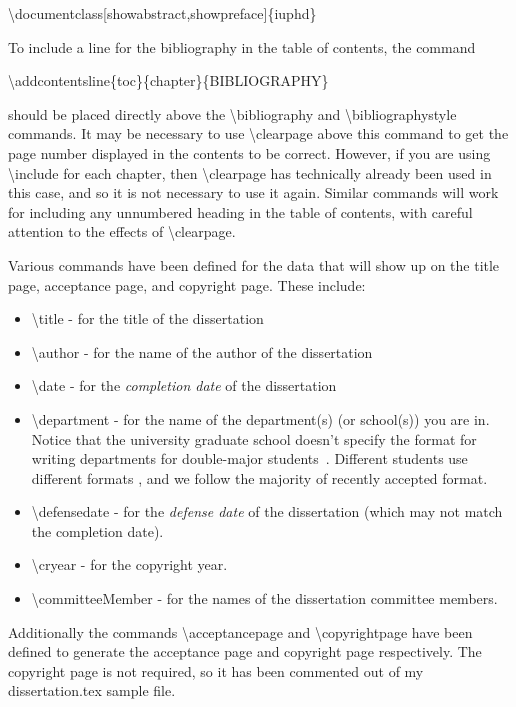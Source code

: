 \textbackslash documentclass[showabstract,showpreface]\{iuphd\}
\medskip

\noindent To include a line for the bibliography in the table of contents, the command
\medskip

\textbackslash addcontentsline\{toc\}\{chapter\}\{BIBLIOGRAPHY\}
\medskip

\noindent should be placed directly above the \textbackslash bibliography and \textbackslash bibliographystyle commands.  It may be necessary
to use \textbackslash clearpage above this command to get the page number displayed in the contents to be correct.  However, if you are using
\textbackslash include for each chapter, then \textbackslash clearpage has technically already been used in this case, and so it is not
necessary to use it again. Similar commands will work for including any unnumbered heading in the table of contents, with careful attention
to the effects of \textbackslash clearpage.

Various commands have been defined for the data that will show up on the title page, acceptance page, and copyright page.  These include:
\begin{itemize}
 \item \textbackslash title - for the title of the dissertation
 \item \textbackslash author - for the name of the author of the dissertation
 \item \textbackslash date - for the \emph{completion date} of the dissertation
 \item \textbackslash department - for the name of the department(s) (or school(s)) you are in.  Notice that the university graduate school doesn't specify the format for writing departments for double-major students~\cite{DoctoralFormatting2018}.  Different students use different formats \cite{Hansen2015,Agmon2016,Bambach2016}, and we follow the majority of recently accepted format.
 \item \textbackslash defensedate - for the \emph{defense date} of the dissertation (which may not match the completion date).
 \item \textbackslash cryear - for the copyright year.
 \item \textbackslash committeeMember - for the names of the dissertation committee members.
\end{itemize}

Additionally the commands \textbackslash acceptancepage and \textbackslash copyrightpage have been defined to generate the acceptance page and copyright page
respectively.  The copyright page is not required, so it has been commented out of my dissertation.tex sample file.

